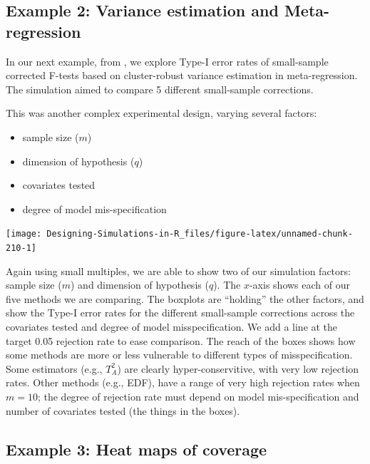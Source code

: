 \documentclass[
]{book}
\providecommand{\tightlist}{%
  \setlength{\itemsep}{0pt}\setlength{\parskip}{0pt}}
\begin{document}
\subsection{Example 2: Variance estimation and Meta-regression}\label{example-2-variance-estimation-and-meta-regression}

In our next example, from \citet{tipton2015small}, we explore Type-I error rates of small-sample corrected F-tests based on cluster-robust variance estimation in meta-regression.
The simulation aimed to compare 5 different small-sample corrections.

This was another complex experimental design, varying several factors:

\begin{itemize}
\tightlist
\item
  sample size (\(m\))
\item
  dimension of hypothesis (\(q\))
\item
  covariates tested
\item
  degree of model mis-specification
\end{itemize}

\begin{center}\texttt{[image: Designing-Simulations-in-R\_files/figure-latex/unnamed-chunk-210-1]} \end{center}

Again using small multiples, we are able to show two of our simulation factors: sample size (\(m\)) and dimension of hypothesis (\(q\)).
The \(x\)-axis shows each of our five methods we are comparing.
The boxplots are ``holding'' the other factors, and show the Type-I error rates for the different small-sample corrections across the covariates tested and degree of model misspecification.
We add a line at the target 0.05 rejection rate to ease comparison.
The reach of the boxes shows how some methods are more or less vulnerable to different types of misspecification.
Some estimators (e.g., \(T^2_A\)) are clearly hyper-conservitive, with very low rejection rates.
Other methods (e.g., EDF), have a range of very high rejection rates when \(m = 10\); the degree of rejection rate must depend on model mis-specification and number of covariates tested (the things in the boxes).

\subsection{Example 3: Heat maps of coverage}\label{example-3-heat-maps-of-coverage}
\end{document}
